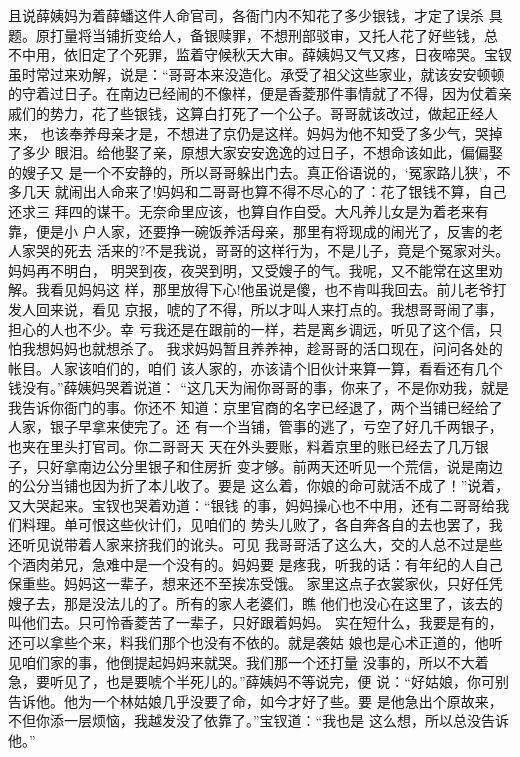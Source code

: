 且说薛姨妈为着薛蟠这件人命官司，各衙门内不知花了多少银钱，才定了误杀
具题。原打量将当铺折变给人，备银赎罪，不想刑部驳审，又托人花了好些钱，总
不中用，依旧定了个死罪，监着守候秋天大审。薛姨妈又气又疼，日夜啼哭。宝钗
虽时常过来劝解，说是：“哥哥本来没造化。承受了祖父这些家业，就该安安顿顿
的守着过日子。在南边已经闹的不像样，便是香菱那件事情就了不得，因为仗着亲
戚们的势力，花了些银钱，这算白打死了一个公子。哥哥就该改过，做起正经人来，
也该奉养母亲才是，不想进了京仍是这样。妈妈为他不知受了多少气，哭掉了多少
眼泪。给他娶了亲，原想大家安安逸逸的过日子，不想命该如此，偏偏娶的嫂子又
是一个不安静的，所以哥哥躲出门去。真正俗语说的，‘冤家路儿狭’，不多几天
就闹出人命来了!妈妈和二哥哥也算不得不尽心的了：花了银钱不算，自己还求三
拜四的谋干。无奈命里应该，也算自作自受。大凡养儿女是为着老来有靠，便是小
户人家，还要挣一碗饭养活母亲，那里有将现成的闹光了，反害的老人家哭的死去
活来的?不是我说，哥哥的这样行为，不是儿子，竟是个冤家对头。妈妈再不明白，
明哭到夜，夜哭到明，又受嫂子的气。我呢，又不能常在这里劝解。我看见妈妈这
样，那里放得下心!他虽说是傻，也不肯叫我回去。前儿老爷打发人回来说，看见
京报，唬的了不得，所以才叫人来打点的。我想哥哥闹了事，担心的人也不少。幸
亏我还是在跟前的一样，若是离乡调远，听见了这个信，只怕我想妈妈也就想杀了。
我求妈妈暂且养养神，趁哥哥的活口现在，问问各处的帐目。人家该咱们的，咱们
该人家的，亦该请个旧伙计来算一算，看看还有几个钱没有。”薛姨妈哭着说道：
“这几天为闹你哥哥的事，你来了，不是你劝我，就是我告诉你衙门的事。你还不
知道：京里官商的名字已经退了，两个当铺已经给了人家，银子早拿来使完了。还
有一个当铺，管事的逃了，亏空了好几千两银子，也夹在里头打官司。你二哥哥天
天在外头要账，料着京里的账已经去了几万银子，只好拿南边公分里银子和住房折
变才够。前两天还听见一个荒信，说是南边的公分当铺也因为折了本儿收了。要是
这么着，你娘的命可就活不成了！”说着，又大哭起来。宝钗也哭着劝道：“银钱
的事，妈妈操心也不中用，还有二哥哥给我们料理。单可恨这些伙计们，见咱们的
势头儿败了，各自奔各自的去也罢了，我还听见说带着人家来挤我们的讹头。可见
我哥哥活了这么大，交的人总不过是些个酒肉弟兄，急难中是一个没有的。妈妈要
是疼我，听我的话：有年纪的人自己保重些。妈妈这一辈子，想来还不至挨冻受饿。
家里这点子衣裳家伙，只好任凭嫂子去，那是没法儿的了。所有的家人老婆们，瞧
他们也没心在这里了，该去的叫他们去。只可怜香菱苦了一辈子，只好跟着妈妈。
实在短什么，我要是有的，还可以拿些个来，料我们那个也没有不依的。就是袭姑
娘也是心术正道的，他听见咱们家的事，他倒提起妈妈来就哭。我们那一个还打量
没事的，所以不大着急，要听见了，也是要唬个半死儿的。”薛姨妈不等说完，便
说：“好姑娘，你可别告诉他。他为一个林姑娘几乎没要了命，如今才好了些。要
是他急出个原故来，不但你添一层烦恼，我越发没了依靠了。”宝钗道：“我也是
这么想，所以总没告诉他。”

